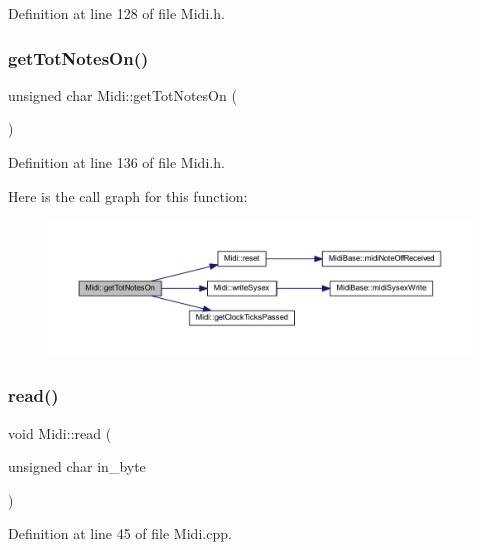 Definition at line 128 of file Midi.\+h.

\mbox{\label{class_midi_a138bcab57f6cf89474d774de29be9939}} 
\subsubsection{\texorpdfstring{get\+Tot\+Notes\+On()}{getTotNotesOn()}}
{\footnotesize\ttfamily unsigned char Midi\+::get\+Tot\+Notes\+On (\begin{DoxyParamCaption}{ }\end{DoxyParamCaption})\hspace{0.3cm}{\ttfamily [inline]}}



Definition at line 136 of file Midi.\+h.

Here is the call graph for this function\+:
\nopagebreak
\begin{figure}[H]
\begin{center}
\leavevmode
\includegraphics[width=350pt]{da/db9/class_midi_a138bcab57f6cf89474d774de29be9939_cgraph}
\end{center}
\end{figure}
\mbox{\label{class_midi_a6003d2a28da28e44143e494faf16acd9}} 
\subsubsection{\texorpdfstring{read()}{read()}}
{\footnotesize\ttfamily void Midi\+::read (\begin{DoxyParamCaption}\item[{unsigned char}]{in\+\_\+byte }\end{DoxyParamCaption})}



Definition at line 45 of file Midi.\+cpp.

